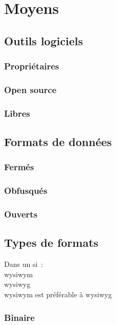 \section{Moyens}

\subsection{Outils logiciels}

\subsubsection{Propriétaires}

\subsubsection{Open source}

\subsubsection{Libres}

\subsection{Formats de données}

\subsubsection{Fermés}

\subsubsection{Obfusqués}

\subsubsection{Ouverts}

\pagebreak
\subsection{Types de formats}
Dans un \gls{si} :\\
\gls{wysiwym} \cite{wysiwym}\\
\gls{wysiwyg} \cite{wysiwyg}\\
\gls{wysiwym} est préférable à \gls{wysiwyg}

\subsubsection{Binaire}

